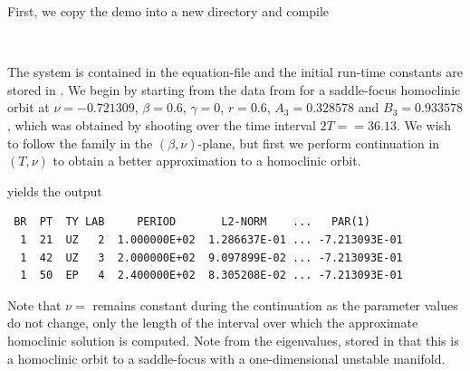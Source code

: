 \documentclass[12pt]{report}
\begin{document}
First, we copy the demo into a new directory and compile
\begin{center}
 \\
\end{center}
The system is contained in 
the equation-file  and the initial run-time constants
are stored in . We begin by starting from
the data from  for a saddle-focus homoclinic orbit 
at 
$\nu=-0.721309$, $\beta=0.6$, $\gamma=0$, $r=0.6$, $A_3=0.328578$ 
and $B_3=0.933578$, which was obtained by shooting over 
the time interval $2T=$$=36.13$.
We wish to follow the family in the $(\beta,\nu)$-plane, but 
first we perform continuation in $(T,\nu)$ to obtain a better 
approximation to a homoclinic orbit.
\begin{center}
\end{center} 
yields the output
\begin{verbatim}
 BR  PT  TY LAB     PERIOD       L2-NORM    ...   PAR(1)     
  1  21  UZ   2  1.000000E+02  1.286637E-01 ... -7.213093E-01
  1  42  UZ   3  2.000000E+02  9.097899E-02 ... -7.213093E-01
  1  50  EP   4  2.400000E+02  8.305208E-02 ... -7.213093E-01
\end{verbatim}
Note that $\nu=$ remains constant during the continuation
as the parameter values do not change, only the length of
the interval over which the approximate homoclinic solution is computed.
Note from the eigenvalues, stored in  that this is a homoclinic
orbit to a saddle-focus with a one-dimensional unstable manifold.
\end{document}
